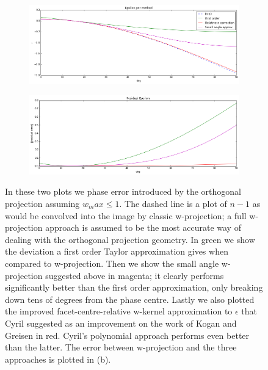 \begin{figure}[h]
  \begin{mdframed}
    \centering
    \begin{subfigure}[b]{0.7\textwidth}
      \centering
      \includegraphics[width=\textwidth]{images/coplanar_error.png}
      \caption{}
    \end{subfigure}  
    \begin{subfigure}[b]{0.7\textwidth}
      \centering
      \includegraphics[width=\textwidth]{images/coplanar_error_residuals.png}
      \caption{}
    \end{subfigure}
    \caption[Coplanar faceting error]{In these two plots we phase error introduced by the orthogonal projection assuming $w_max\leq 1$. The dashed line is a plot of $n-1$ as
    would be convolved into the image by classic w-projection; a full w-projection approach is assumed to be the most accurate way of dealing with the orthogonal projection geometry.
    In green we show the deviation a first order Taylor approximation gives when compared to w-projection\cite{aipsfaceting}. Then we show the small angle w-projection
    suggested above in magenta; it clearly performs significantly better than the first order approximation, only breaking down tens of degrees from the phase centre. Lastly we also
    plotted the improved facet-centre-relative w-kernel approximation to $\epsilon$ that Cyril\cite{tassefaceting} suggested as an improvement on the work of 
    Kogan and Greisen \cite{aipsfaceting} in red. Cyril's polynomial approach \cite{tassefaceting} performs even better than the latter. The error between w-projection and the three
    approaches is plotted in (b).}
    \label{fig_error}
  \end{mdframed}
\end{figure}

